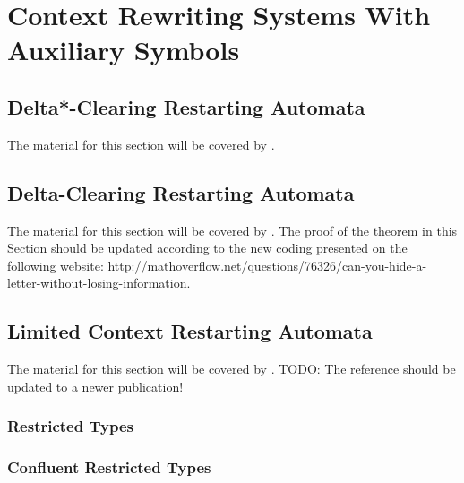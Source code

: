 \chapter{Context Rewriting Systems With Auxiliary Symbols}\label{chapter:crs_aux}

\section{Delta*-Clearing Restarting Automata}

The material for this section will be covered by \cite{CM11}.

\section{Delta-Clearing Restarting Automata}

The material for this section will be covered by \cite{CM11}.
The proof of the theorem in this Section should be updated according to the new coding presented on the following website: 
\url{http://mathoverflow.net/questions/76326/can-you-hide-a-letter-without-losing-information}.

\section{Limited Context Restarting Automata}

The material for this section will be covered by \cite{OCM12}.
TODO: The reference should be updated to a newer publication!

\subsection{Restricted Types}

\subsection{Confluent Restricted Types}
